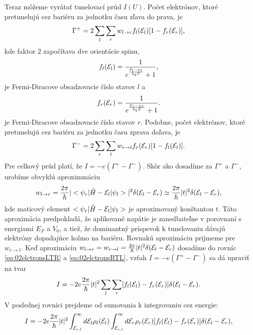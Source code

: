 Teraz môžeme vyrátať tunelovací prúd $I(U)$.
Počet elektrónov, ktoré pretunelujú cez bariéru za jednotku času zľava do prava, je
\begin{equation}
\label{eq:02elctronsLTR}
\Gamma^+=2\sum_{l}{\sum_{r} w_{l \to r} f_l(\mathcal{E}_l)[1-f_r(\mathcal{E}_r)]} \text{,}
\end{equation}
kde faktor $2$ započítava dve orientácie spinu,
\begin{equation}
 \label{eq:02fermidirac_left}
 f_l(\mathcal{E}_l)=\frac{1}{e^{\frac{\mathcal{E}_l-\mu_l}{k_bT}}+1}\text{,}
\end{equation}
je Fermi-Diracove obsadzovacie číslo stavov $l$ a
\begin{equation}
 \label{eq:02fermidirac_right}
 f_r(\mathcal{E}_r)=\frac{1}{e^{\frac{\mathcal{E}_r-\mu_r}{k_bT}}+1}\text{.}
\end{equation}
je Fermi-Diracove obsadzovacie číslo stavov $r$.
Podobne, počet elektrónov, ktoré pretunelujú cez bariéru za jednotku času zprava doľava, je
\begin{equation}
\label{eq:02elctronsRTL}
\Gamma^-=2\sum_{r}{\sum_{l} w_{r \to l} f_r(\mathcal{E}_r)[1-f_l(\mathcal{E}_l)]} \text{.}
\end{equation}
Pre celkový prúd platí, že $I=-e (\Gamma^+ - \Gamma^-)$.
Skôr ako dosadíme za $\Gamma^+$ a $\Gamma^-$, urobíme
obvyklú aproximmáciu
\begin{equation}
 \label{eq:02golden_ruleaprox}
 w_{l\to r}=\frac{2\pi}{\hbar} |<\psi_r|\hat{H}-\mathcal{E}_l|\psi_l>|^{2} \delta(\mathcal{E}_l-\mathcal{E}_r) \simeq \frac{2\pi}{\hbar} |t|^{2} \delta(\mathcal{E}_l-\mathcal{E}_r) \text{,}
\end{equation}
kde maticový element $<\psi_r|\hat{H}-\mathcal{E}_l|\psi_l>$ je aproximovaný konštantou $t$. Táto aproximácia predpokladá, že aplikované napätie je zanedbateľne v porovnaní s energiami
$E_F$ a $V_0$, a tiež, že dominantný príspevok k tunelovaniu dávajú elektróny dopadajúce kolmo na bariéru. Rovnakú aproximáciu prijmeme pre $w_{r\to l}$.
Keď aproximáciu $w_{l\to r}= w_{r\to l} = \frac{2\pi}{\hbar} |t|^{2} \delta(\mathcal{E}_l-\mathcal{E}_r)$ dosadíme do rovníc \eqref{eq:02elctronsLTR} a \eqref{eq:02elctronsRTL},
vzťah $I=-e (\Gamma^+ - \Gamma^-)$ sa dá upraviť na tvar
\begin{equation}
\label{eq:02current}
I=  -2e \frac{2\pi}{\hbar} |t|^{2} \sum_{l} \sum_{r} [f_l(\mathcal{E}_l) -  f_r(\mathcal{E}_r)] \delta(\mathcal{E}_l-\mathcal{E}_r) \text{.}
\end{equation}
V poslednej rovnici prejdeme od sumovania k integrovaniu cez energie:
\begin{equation}
\label{eq:02current2}
I= -2e \frac{2\pi}{\hbar} |t|^{2} \int_{\mathcal{E}_{c,l}}^\infty d\mathcal{E}_l\rho_l(\mathcal{E}_l) \int_{\mathcal{E}_{c,l}}^\infty d\mathcal{E}_r\rho_r(\mathcal{E}_r) [f_l(\mathcal{E}_l) -  f_r(\mathcal{E}_r)] \delta(\mathcal{E}_l-\mathcal{E}_r) \text{,}
\end{equation}
